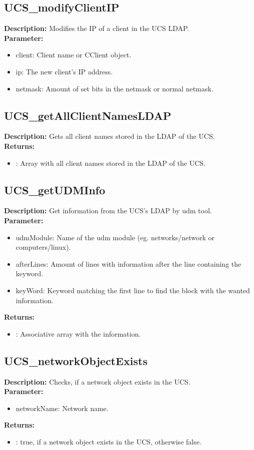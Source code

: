 \subsection{UCS\_modifyClientIP}
\textbf{Description:} Modifies the IP of a client in the UCS LDAP.\\
\textbf{Parameter:}
\begin{itemize}
\item client: Client name or CClient object.
\item ip: The new client's IP address.
\item netmask: Amount of set bits in the netmask or normal netmask.
\end{itemize}

\subsection{UCS\_getAllClientNamesLDAP}
\textbf{Description:} Gets all client names stored in the LDAP of the UCS.\\
\textbf{Returns:}
\begin{itemize}
\item : Array with all client names stored in the LDAP of the UCS.
\end{itemize}

\subsection{UCS\_getUDMInfo}
\textbf{Description:} Get information from the UCS's LDAP by udm tool.\\
\textbf{Parameter:}
\begin{itemize}
\item udmModule: Name of the udm module (eg. networks/network or computers/linux).
\item afterLines: Amount of lines with information after the line containing the keyword.
\item keyWord: Keyword matching the first line to find the block with the wanted information.
\end{itemize}
\textbf{Returns:}
\begin{itemize}
\item : Associative array with the information.
\end{itemize}

\subsection{UCS\_networkObjectExists}
\textbf{Description:} Checks, if a network object exists in the UCS.\\
\textbf{Parameter:}
\begin{itemize}
\item networkName: Network name.
\end{itemize}
\textbf{Returns:}
\begin{itemize}
\item : true, if a network object exists in the UCS, otherwise false.
\end{itemize}

